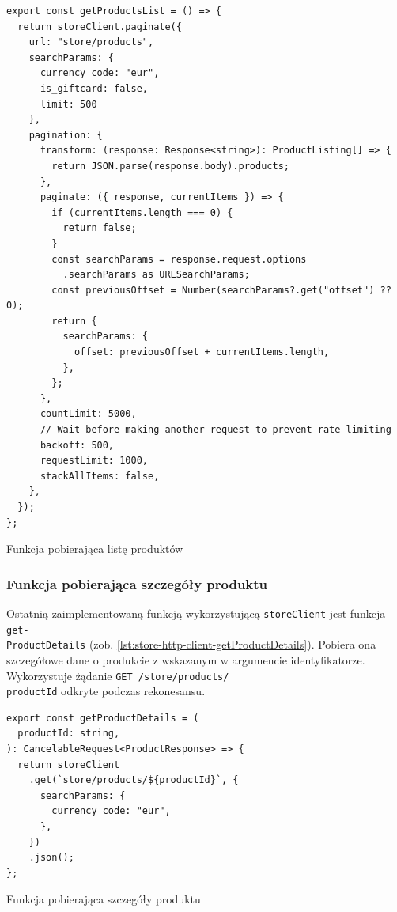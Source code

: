 \begin{listing}[H]
    \begin{verbatim}
export const getProductsList = () => {
  return storeClient.paginate({
    url: "store/products",
    searchParams: {
      currency_code: "eur",
      is_giftcard: false,
      limit: 500
    },
    pagination: {
      transform: (response: Response<string>): ProductListing[] => {
        return JSON.parse(response.body).products;
      },
      paginate: ({ response, currentItems }) => {
        if (currentItems.length === 0) {
          return false;
        }
        const searchParams = response.request.options
          .searchParams as URLSearchParams;
        const previousOffset = Number(searchParams?.get("offset") ?? 0);
        return {
          searchParams: {
            offset: previousOffset + currentItems.length,
          },
        };
      },
      countLimit: 5000,
      // Wait before making another request to prevent rate limiting
      backoff: 500,
      requestLimit: 1000,
      stackAllItems: false,
    },
  });
};
    \end{verbatim}
    \caption{Funkcja pobierająca listę produktów}
    \label{lst:store-http-client-getProductsList}
\end{listing}

\subsubsection{Funkcja pobierająca szczegóły produktu}

Ostatnią zaimplementowaną funkcją wykorzystującą \texttt{storeClient} jest funkcja \texttt{get-\\ProductDetails} (zob. \autoref{lst:store-http-client-getProductDetails}).
Pobiera ona szczegółowe dane o produkcie z wskazanym w argumencie identyfikatorze.
Wykorzystuje żądanie \texttt{GET /store/products/\\{{productId}}} odkryte podczas rekonesansu.

\begin{listing}[H]
    \begin{verbatim}
export const getProductDetails = (
  productId: string,
): CancelableRequest<ProductResponse> => {
  return storeClient
    .get(`store/products/${productId}`, {
      searchParams: {
        currency_code: "eur",
      },
    })
    .json();
};
    \end{verbatim}
    \caption{Funkcja pobierająca szczegóły produktu}
    \label{lst:store-http-client-getProductDetails}
\end{listing}

